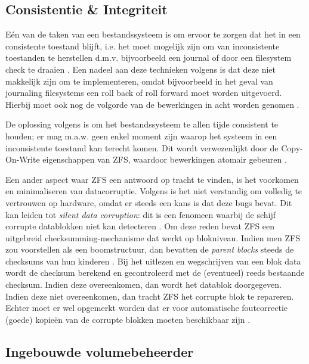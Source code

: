 \subsection{Consistentie \& Integriteit}

Eén van de taken van een bestandssysteem is om ervoor te zorgen dat het in een consistente toestand blijft, i.e. het moet mogelijk zijn om van inconsistente toestanden te herstellen d.m.v. bijvoorbeeld een journal of door een filesystem check te draaien \autocite{OSThreePiecesRemzi2015}. Een nadeel aan deze technieken volgens \textcite{ZFSBonwick} is dat deze niet makkelijk zijn om te implementeren, omdat bijvoorbeeld in het geval van journaling filesystems een roll back of roll forward moet worden uitgevoerd. Hierbij moet ook nog de volgorde van de bewerkingen in acht worden genomen \autocite{OSThreePiecesRemzi2015}. 

De oplossing volgens \textcite{ZFSBonwick} is om het bestandssysteem te allen tijde consistent te houden; er mag m.a.w. geen enkel moment zijn waarop het systeem in een inconsistente toestand kan terecht komen. Dit wordt verwezenlijkt door de Copy-On-Write eigenschappen van ZFS, waardoor bewerkingen atomair gebeuren \autocite{Li2009}. 

Een ander aspect waar ZFS een antwoord op tracht te vinden, is het voorkomen en minimaliseren van datacorruptie. Volgens \textcite{ZFSBonwick} is het niet verstandig om volledig te vertrouwen op hardware, omdat er steeds een kans is dat deze bugs bevat. Dit kan leiden tot \textit{silent data corruption}: dit is een fenomeen waarbij de schijf corrupte datablokken niet kan detecteren \autocite{OSThreePiecesRemzi2015}. Om deze reden bevat ZFS een uitgebreid checksumming-mechanisme dat werkt op blokniveau. Indien men ZFS zou voorstellen als een boomstructuur, dan bevatten de \textit{parent blocks} steeds de checksums van hun kinderen \autocite{ZFSBonwick}. Bij het uitlezen en wegschrijven van een blok data wordt de checksum berekend en gecontroleerd met de (eventueel) reeds bestaande checksum. Indien deze overeenkomen, dan wordt het datablok doorgegeven. Indien deze niet overeenkomen, dan tracht ZFS het corrupte blok te repareren. Echter moet er wel opgemerkt worden dat er voor automatische foutcorrectie (goede) kopieën van de corrupte blokken moeten beschikbaar zijn \autocite{Li2009}.

\subsection{Ingebouwde volumebeheerder}

